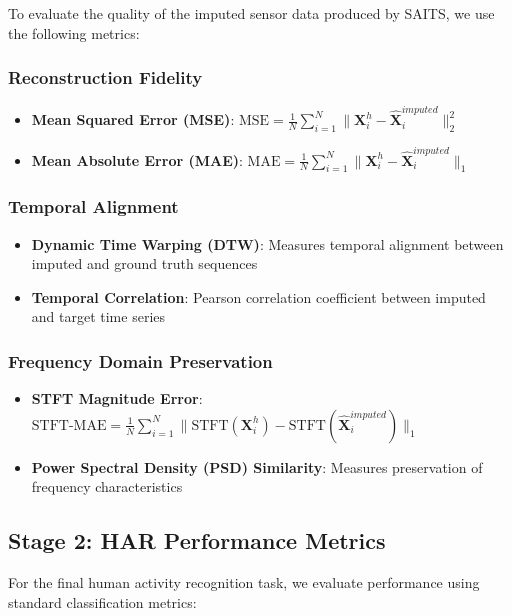 \hspace{2em}To evaluate the quality of the imputed sensor data produced by SAITS, we use the following metrics:

\subsubsection{Reconstruction Fidelity}
\begin{itemize}
    \item \textbf{Mean Squared Error (MSE)}: $\text{MSE} = \frac{1}{N} \sum_{i=1}^{N} \|\mathbf{X}^h_i - \hat{\mathbf{X}}^{imputed}_i\|_2^2$
    \item \textbf{Mean Absolute Error (MAE)}: $\text{MAE} = \frac{1}{N} \sum_{i=1}^{N} \|\mathbf{X}^h_i - \hat{\mathbf{X}}^{imputed}_i\|_1$
\end{itemize}

\subsubsection{Temporal Alignment}
\begin{itemize}
    \item \textbf{Dynamic Time Warping (DTW)}: Measures temporal alignment between imputed and ground truth sequences
    \item \textbf{Temporal Correlation}: Pearson correlation coefficient between imputed and target time series
\end{itemize}

\subsubsection{Frequency Domain Preservation}
\begin{itemize}
    \item \textbf{STFT Magnitude Error}: $\text{STFT-MAE} = \frac{1}{N} \sum_{i=1}^{N} \|\text{STFT}(\mathbf{X}^h_i) - \text{STFT}(\hat{\mathbf{X}}^{imputed}_i)\|_1$
    \item \textbf{Power Spectral Density (PSD) Similarity}: Measures preservation of frequency characteristics
\end{itemize}

\subsection{Stage 2: HAR Performance Metrics}

\hspace{2em}For the final human activity recognition task, we evaluate performance using standard classification metrics:

